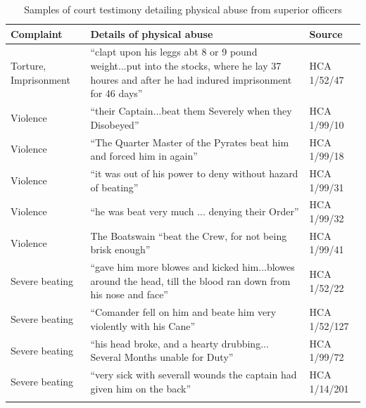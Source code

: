 \begin{table}
\caption{\label{tab:key:4.1} Samples of court testimony detailing physical abuse from superior officers}
\small
\begin{tabularx}{\textwidth}{lQl}
\lsptoprule
\textbf{Complaint} & \textbf{Details} \textbf{of} \textbf{physical} \textbf{abuse} & \textbf{Source}\\
\midrule
Torture, Imprisonment & “clapt upon his leggs abt 8 or 9 pound weight...put into the stocks, where he lay 37 houres and after he had indured imprisonment for 46 days” & HCA 1/52/47\\
Violence & “their Captain...beat them Severely when they Disobeyed” & HCA 1/99/10\\
Violence & “The Quarter Master of the Pyrates beat him and forced him in again” & HCA 1/99/18\\
Violence & “it was out of his power to deny without hazard of beating” & HCA 1/99/31\\
Violence & “he was beat very much ... denying their Order” & HCA 1/99/32\\
Violence & The Boatswain “beat the Crew, for not being brisk enough” & HCA 1/99/41\\
Severe beating & “gave him more blowes and kicked him...blowes around the head, till the blood ran down from his nose and face” & HCA 1/52/22\\
Severe beating & “Comander fell on him and beate him very violently with his Cane” & HCA 1/52/127\\
Severe beating & “his head broke, and a hearty drubbing... Several Months unable for Duty” & HCA 1/99/72\\
Severe beating & “very sick with severall wounds the captain had given him on the back” & HCA 1/14/201\\
\lspbottomrule
\end{tabularx}
\end{table}


